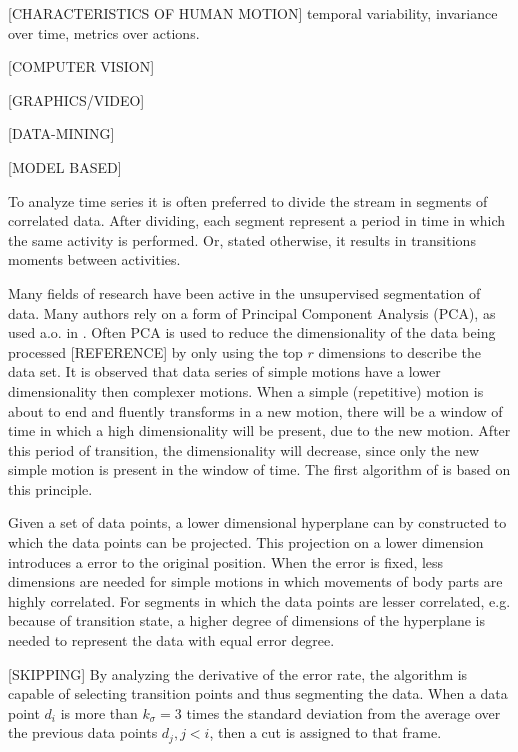 [CHARACTERISTICS OF HUMAN MOTION]
temporal variability, invariance over time, metrics over actions.

[COMPUTER VISION]

[GRAPHICS/VIDEO]

[DATA-MINING]

[MODEL BASED]

To analyze time series it is often preferred to divide the stream in segments 
of correlated data. After dividing, each segment represent a period in time in 
which the same activity is performed. Or, stated otherwise, it results in 
transitions moments between activities.

Many fields of research have been active in the unsupervised segmentation of 
data. Many authors rely on a form of Principal Component Analysis (PCA), as 
used a.o. in \cite{barbivc2004segmenting}. Often PCA is used to reduce the 
dimensionality of the data being processed [REFERENCE] by only using the top 
$r$ dimensions to describe the data set. It is observed that data series of 
simple motions have a lower dimensionality then complexer motions. When a 
simple (repetitive) motion is about to end and fluently transforms in a new 
motion, there will be a window of time in which a high dimensionality will be 
present, due to the new motion. After this period of transition, the 
dimensionality will decrease, since only the new simple motion is present in 
the window of time. The first algorithm of \cite{barbivc2004segmenting} is 
based on this principle.

Given a set of data points, a lower dimensional hyperplane can by constructed 
to which the data points can be projected. This projection on a lower 
dimension introduces a error to the original position. When the error is 
fixed, less dimensions are needed for simple motions in which movements of 
body parts are highly correlated. For segments in which the data points are 
lesser correlated, e.g. because of transition state, a higher degree of 
dimensions of the hyperplane is needed to represent the data with equal error 
degree.

[SKIPPING]
By analyzing the derivative of the error rate, the algorithm is capable of 
selecting transition points and thus segmenting the data. When a data point 
$d_i$ is more than $k_\sigma=3$ times the standard deviation from the average 
over the previous data points $d_j, j<i$, then a cut is assigned to that frame.

